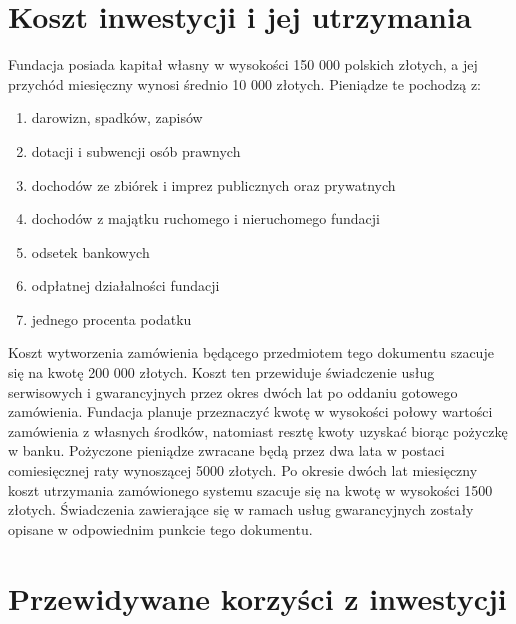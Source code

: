 \documentclass{article}
\begin{document}
\section{Koszt inwestycji i jej utrzymania}
Fundacja posiada kapitał własny w wysokości 150 000 polskich złotych, a jej przychód miesięczny wynosi średnio 10 000 złotych. Pieniądze te pochodzą z:
\begin{enumerate}
	\item darowizn, spadków, zapisów
	\item dotacji i subwencji osób prawnych
	\item dochodów ze zbiórek i imprez publicznych oraz prywatnych
	\item dochodów z majątku ruchomego i nieruchomego fundacji
	\item odsetek bankowych
	\item odpłatnej działalności fundacji
	\item jednego procenta podatku
\end{enumerate}
Koszt wytworzenia zamówienia będącego przedmiotem tego dokumentu szacuje się na kwotę 200 000 złotych. Koszt ten przewiduje świadczenie usług serwisowych i gwarancyjnych przez okres dwóch lat po oddaniu gotowego zamówienia. Fundacja planuje przeznaczyć kwotę w wysokości połowy wartości zamówienia z własnych środków, natomiast resztę kwoty uzyskać biorąc pożyczkę w banku. Pożyczone pieniądze zwracane będą przez dwa lata w postaci comiesięcznej raty wynoszącej 5000 złotych. Po okresie dwóch lat miesięczny koszt utrzymania zamówionego systemu szacuje się na kwotę w wysokości 1500 złotych. Świadczenia zawierające się w ramach usług gwarancyjnych zostały opisane w odpowiednim punkcie tego dokumentu.

\section{Przewidywane korzyści z inwestycji}
\end{document}
